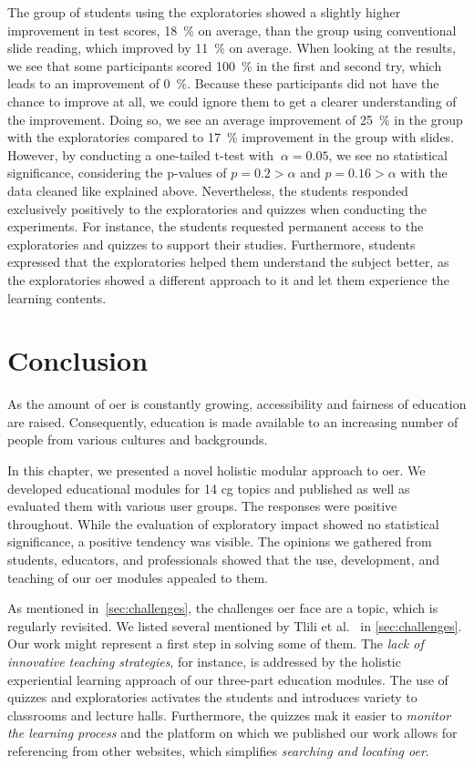 The group of students using the exploratories showed a slightly higher improvement in test scores, 18~\% on average, than the group using conventional slide reading, which improved by 11~\% on average. When looking at the results, we see that some participants scored 100~\% in the first and second try, which leads to an improvement of 0~\%. Because these participants did not have the chance to improve at all, we could ignore them to get a clearer understanding of the improvement. Doing so, we see an average improvement of 25~\% in the group with the exploratories compared to 17~\% improvement in the group with slides. However, by conducting a one-tailed t-test with \(\ \alpha=0.05\), we see no statistical significance, considering the p-values of \(p=0.2>\alpha\) and \(p=0.16>\alpha\) with the data cleaned like explained above.
Nevertheless, the students responded exclusively positively to the exploratories and quizzes when conducting the experiments. For instance, the students requested permanent access to the exploratories and quizzes to support their studies. Furthermore, students expressed that the exploratories helped them understand the subject better, as the exploratories showed a different approach to it and let them experience the learning contents.


\section{Conclusion} %
As the amount of \acrshort{oer} is constantly growing, accessibility and fairness of education are raised. Consequently, education is made available to an increasing number of people from various cultures and backgrounds.

In this chapter, we presented a novel holistic modular approach to \acrshort{oer}. We developed educational modules for 14 \acrshort{cg} topics and published as well as evaluated them with various user groups. The responses were positive throughout. While the evaluation of exploratory impact showed no statistical significance, a positive tendency was visible. The opinions we gathered from students, educators, and professionals showed that the use, development, and teaching of our \acrshort{oer} modules appealed to them.

As mentioned in~\autoref{sec:challenges}, the challenges \acrshort{oer} face are a topic, which is regularly revisited. We listed several mentioned by Tlili et al.~\cite{tlili:2021:towards} in \autoref{sec:challenges}. Our work might represent a first step in solving some of them. The \emph{lack of innovative teaching strategies}, for instance, is addressed by the holistic experiential learning approach of our three-part education modules. The use of quizzes and exploratories activates the students and introduces variety to classrooms and lecture halls. Furthermore, the quizzes mak it easier to \emph{monitor the learning process} and the platform on which we published our work allows for referencing from other websites, which simplifies \emph{searching and locating \acrshort{oer}}.



